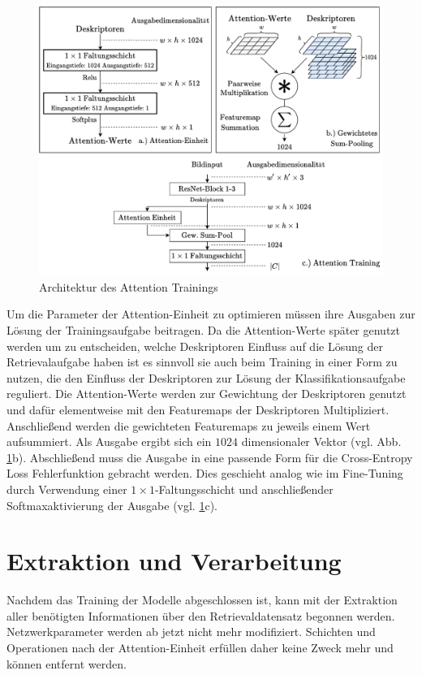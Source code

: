 \begin{figure}
\centering
\includegraphics[scale=0.77]{attention_spaced.pdf}
\caption{Architektur des Attention Trainings}
\label{attention}
\end{figure}
Um die Parameter der Attention-Einheit zu optimieren müssen ihre Ausgaben zur Lösung der Trainingsaufgabe beitragen. Da die Attention-Werte später genutzt werden um zu entscheiden, welche Deskriptoren Einfluss auf die Lösung der Retrievalaufgabe haben ist es sinnvoll sie auch beim Training in einer Form zu nutzen, die den Einfluss der Deskriptoren zur Lösung der Klassifikationsaufgabe reguliert. Die Attention-Werte werden zur Gewichtung der Deskriptoren genutzt und dafür elementweise mit den Featuremaps der Deskriptoren Multipliziert. Anschließend werden die gewichteten Featuremaps zu jeweils einem Wert aufsummiert. Als Ausgabe ergibt sich ein $1024$ dimensionaler Vektor (vgl. Abb. \ref{attention}b). Abschließend muss die Ausgabe in eine passende Form für die Cross-Entropy Loss Fehlerfunktion gebracht werden. Dies geschieht analog wie im Fine-Tuning durch Verwendung einer $1\times1$-Faltungsschicht und anschließender Softmaxaktivierung der Ausgabe (vgl. \ref{attention}c).

\section{Extraktion und Verarbeitung}

Nachdem das Training der Modelle abgeschlossen ist, kann mit der Extraktion aller benötigten Informationen über den Retrievaldatensatz begonnen werden. Netzwerkparameter werden ab jetzt nicht mehr modifiziert. Schichten und Operationen nach der Attention-Einheit erfüllen daher keine Zweck mehr und können entfernt werden.
